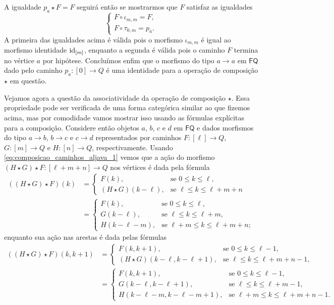 A igualdade $p_a \star F = F$ seguirá então se mostrarmos que $F$ satisfaz as igualdades
\begin{displaymath}
    \begin{cases}
        F \circ \iota_{m,m} = F, \\
        F \circ \tau_{0,m} = p_a.
    \end{cases}
\end{displaymath}
A primeira das igualdades acima é válida pois o morfismo $\iota_{m,m}$ é igual ao morfismo identidade $\mathrm{id}_{[m]}$, enquanto a segunda é válida pois o caminho $F$ termina no vértice $a$ por hipótese.
Concluímos enfim que o morfismo do tipo $a \to a$ em $\mathsf{FQ}$ dado pelo caminho $p_a: [0] \to Q$ é uma identidade para a operação de composição $\star$ em questão.

Vejamos agora a questão da associatividade da operação de composição $\star$.
Essa propriedade pode ser verificada de uma forma categórica similar ao que fizemos acima, mas por comodidade vamos mostrar isso usando as fórmulas explícitas para a composição.
Considere então objetos $a$, $b$, $c$ e $d$ em $\mathsf{FQ}$ e dados morfismos do tipo $a \to b$, $b \to c$ e $c \to d$ representados por caminhos $F: [\ell] \to Q$, $G: [m] \to Q$ e $H: [n] \to Q$, respectivamente.
Usando \eqref{eq:composicao_caminhos_aljava_1} vemos que a ação do morfismo $(H \star G) \star F: [\ell+m+n] \to Q$ nos vértices é dada pela fórmula
\begin{align*}
    ((H \star G) \star F)(k) & =
    \begin{cases}
        F(k), & \text{se } 0 \leq k \leq \ell, \\
        (H \star G)(k-\ell), & \text{se } \ell \leq k \leq \ell+m+n
    \end{cases} \\
    & =
    \begin{cases}
        F(k), & \text{se } 0 \leq k \leq \ell, \\
        G(k-\ell), & \text{se } \ell \leq k \leq \ell+m, \\
        H(k-\ell-m), & \text{se } \ell+m \leq k \leq \ell+m+n;
    \end{cases}
\end{align*}
enquanto sua ação nas arestas é dada pelas fórmulas
\begin{align*}
    ((H \star G) \star F)(k,k+1) & =
    \begin{cases}
        F(k,k+1), & \text{se } 0 \leq k \leq \ell-1, \\
        (H \star G)(k-\ell,k-\ell+1), & \text{se } \ell \leq k \leq \ell+m+n-1,
    \end{cases} \\
    & =
    \begin{cases}
        F(k,k+1), & \text{se } 0 \leq k \leq \ell-1, \\
        G(k-\ell,k-\ell+1), & \text{se } \ell \leq k \leq \ell+m-1, \\
        H(k-\ell-m,k-\ell-m+1), & \text{se } \ell+m \leq k \leq \ell+m+n-1.
    \end{cases}
\end{align*}
